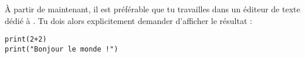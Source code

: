 \documentclass[11pt,class=report,crop=false]{standalone}
\begin{document}
\begin{cours}
À partir de maintenant, il est préférable que tu travailles dans un éditeur de texte dédié à \Python. Tu dois alors explicitement demander d'afficher le résultat :
\begin{lstlisting}
print(2+2)
print("Bonjour le monde !")
\end{lstlisting}

\end{cours}



\end{document}
